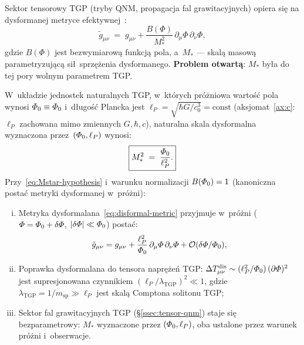 Sektor tensorowy TGP (tryby QNM, propagacja fal grawitacyjnych)
opiera si\k{e} na dysformanej metryce efektywnej~\cite{Bekenstein-disformal}:
\begin{equation}\label{eq:disformal-metric}
  \tilde{g}_{\mu\nu}
  \;=\; g_{\mu\nu}
    + \frac{B(\Phi)}{M_*^2}\,\partial_\mu\Phi\,\partial_\nu\Phi,
\end{equation}
gdzie $B(\Phi)$ jest bezwymiarow\k{a} funkcj\k{a} pola,
a~$M_*$ --- skal\k{a} masow\k{a} parametryzuj\k{a}c\k{a}
si\l{}\ sprz\k{e}\.zenia dysformanego.
\textbf{Problem otwart\k{a}}: $M_*$ by\l{}a do tej pory wolnym
parametrem TGP.

\begin{proposition}%
\label{prop:Mstar-from-substrate}
W~uk\l{}adzie jednostek naturalnych TGP,
w~kt\'orych pr\'o\.zniowa warto\'s\'c pola wynosi
$\varPhi_0 \equiv \varPhi_0$ i~d\l{}ugo\'s\'c Plancka jest
$\ell_P = \sqrt{\hbar G/c_0^3} = \mathrm{const}$
(aksjomat~\ref{ax:c}: $\ell_P$ zachowana mimo zmiennych $G, \hbar, c$),
naturalna skala dysformalna wyznaczona przez~$(\varPhi_0, \ell_P)$ wynosi:
\begin{equation}\label{eq:Mstar-hypothesis}
  \boxed{
    M_*^2 \;=\; \frac{\varPhi_0}{\ell_P^2}.
  }
\end{equation}
Przy~\eqref{eq:Mstar-hypothesis} i~warunku normalizacji
$B(\varPhi_0) = 1$ (kanoniczna postać metryki dysformanej w~pr\'o\.zni):
\begin{enumerate}[(i)]
  \item Metryka dysformalana~\eqref{eq:disformal-metric} przyjmuje
    w~pr\'o\.zni ($\varPhi = \varPhi_0 + \delta\varPhi$, $|\delta\varPhi| \ll \varPhi_0$)
    posta\'c:
    \begin{equation}\label{eq:disformal-vacuum-expand}
      \tilde{g}_{\mu\nu}
      = g_{\mu\nu}
        + \frac{\ell_P^2}{\varPhi_0}\,
          \partial_\mu\varPhi\,\partial_\nu\varPhi
        + \mathcal{O}(\delta\varPhi/\varPhi_0),
    \end{equation}
  \item Poprawka dysformalana do tensora napr\k{e}\.ze\'n TGP:
    $\Delta T_{\mu\nu}^{\mathrm{dis}}
     \sim (\ell_P^2/\varPhi_0)\,(\partial\varPhi)^2$
    jest supresjonowana czynnikiem $(\ell_P/\lambda_{\mathrm{TGP}})^2 \ll 1$,
    gdzie $\lambda_{\mathrm{TGP}} = 1/m_{\mathrm{sp}} \gg \ell_P$
    jest skal\k{a} Comptona solitonu TGP;
  \item Sektor fal grawitacyjnych TGP (\S\ref{ssec:tensor-qnm})
    staje si\k{e} bezparametrowy: $M_*$ wyznaczone przez $(\varPhi_0, \ell_P)$,
    oba ustalone przez warunek pr\'o\.zni i~obserwacje.
\end{enumerate}
\end{proposition}

